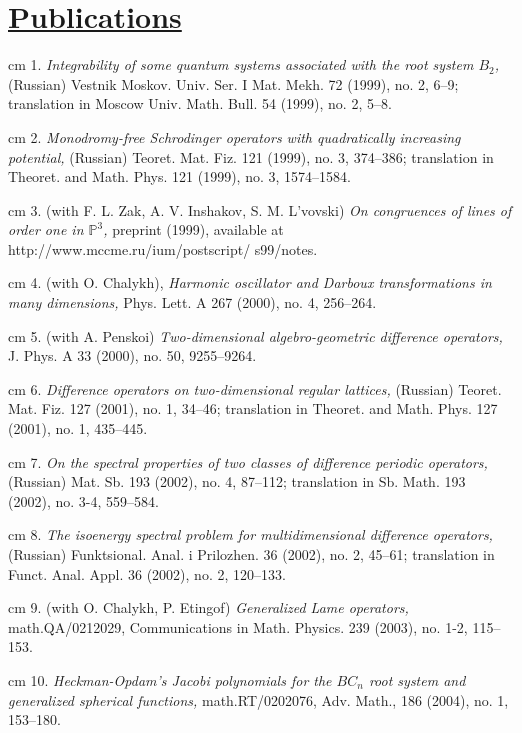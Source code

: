 \documentclass[11pt]{amsart}
\theoremstyle{plain}
\theoremstyle{definition}
\theoremstyle{remark}
\begin{document}
\section*{\Large\underline{Publications}}

\noindent{} cm 1.  {\it Integrability of some quantum
systems associated with the root system $B_2$,} (Russian) Vestnik
Moskov. Univ. Ser. I Mat. Mekh.  72 (1999), no. 2, 6--9;
        translation in Moscow Univ. Math. Bull. 54 (1999), no. 2, 5--8.

\noindent{} cm 2. {\it Monodromy-free Schrodinger
operators with quadratically increasing potential,} (Russian)
Teoret. Mat. Fiz. 121 (1999), no. 3, 374--386; translation in
Theoret. and Math. Phys. 121 (1999), no. 3, 1574--1584.

\noindent{} cm 3. (with F. L. Zak, A. V. Inshakov, S.
M. L'vovski) {\it On congruences of lines of order one in
$\mathbb{P}^3$,} preprint (1999), available at
http://www.mccme.ru/ium/postscript/ s99/notes.

\noindent{} cm 4. (with O.  Chalykh), {\it Harmonic
oscillator and Darboux transformations in many dimensions,} Phys.
Lett. A 267 (2000), no. 4, 256--264.

\noindent{} cm 5. (with  A.  Penskoi) {\it
Two-dimensional algebro-geometric difference operators,} J. Phys.
A 33 (2000), no. 50, 9255--9264.

\noindent{} cm 6. {\it Difference operators on
two-dimensional regular lattices,} (Russian) Teoret. Mat. Fiz. 127
(2001), no. 1, 34--46; translation in Theoret. and Math. Phys. 127
(2001), no. 1, 435--445.

\noindent{} cm 7. {\it On the spectral properties of
two classes of difference periodic operators,} (Russian) Mat. Sb.
193 (2002), no. 4, 87--112; translation in  Sb. Math.  193 (2002),
no. 3-4, 559--584.

\noindent{} cm 8. {\it The isoenergy spectral problem
for multidimensional difference operators,} (Russian) Funktsional.
Anal. i Prilozhen. 36 (2002), no. 2, 45--61;  translation in
Funct. Anal. Appl.  36  (2002),  no. 2, 120--133.

\noindent{} cm 9. (with O. Chalykh,   P. Etingof)
{\it  Generalized Lame operators,} math.QA/0212029, Communications
in Math. Physics. 239 (2003), no. 1-2, 115--153.

\noindent{} cm 10. {\it Heckman-Opdam's Jacobi
       polynomials for the $BC_n$ root system and
        generalized spherical functions,} math.RT/0202076,
        Adv. Math.,  186  (2004),  no. 1, 153--180.
\end{document}
